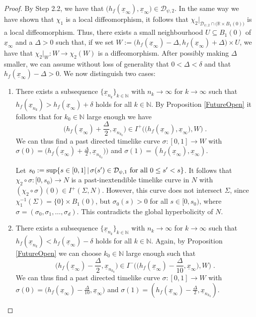 \documentclass[reqno]{article}
\newcommand{\N}{\mathbb{N}}
\newcommand{\R}{\mathbb{R}}
\newcommand{\D}{\mathcal{D}}
\newcommand{\ux}{\underline{x}}
\begin{document}
\begin{proof}
By Step 2.2, we have that $\big(h_f(\ux_\infty), \ux_\infty\big) \in \D_{\psi,2}$. In the same way we have shown that $\chi_1$ is a local diffeomorphism, it follows that $\chi_2|_{\D_{\psi,2} \cap \big(\R \times B_1(0)\big)}$ is a local diffeomorphism. Thus, there exists a small neighbourhood $U \subseteq B_1(0)$ of $\ux_\infty$ and a $\Delta >0$  such that, if we set $W :=\big(h_f(\ux_\infty) - \Delta, h_f(\ux_\infty) + \Delta) \times U$, we have that $\chi_2|_W : W \to \chi_2(W)$ is a diffeomorphism. After possibly making $\Delta$ smaller, we can assume without loss of generality that $0 < \Delta < \delta$ and that $h_f(\ux_\infty) - \Delta >0$.
We now distinguish two cases:
\begin{enumerate}
\item There exists a subsequence $\{\ux_{n_k}\}_{k \in \N}$ with $n_k \to \infty$ for $k \to \infty$ such that $h_f(\ux_{n_k}) > h_f(\ux_\infty) + \delta$ holds for all $k \in \N$. By Proposition \ref{FutureOpen} it follows that for $k_0 \in \N$ large enough we have 
\begin{equation*}
\big( h_f(\ux_\infty) + \frac{\Delta}{2}, \ux_{n_{k_0}}\big) \in I^+\Big(\big(h_f(\ux_\infty), \ux_\infty\big), W\Big) \;.
\end{equation*}
We can thus find a past directed timelike curve $\sigma : [0,1] \to W$ with $\sigma(0) =\big( h_f(\ux_\infty) + \frac{\Delta}{2}, \ux_{n_{k_0}})\big)$ and $\sigma(1) =(h_f(\ux_\infty), \ux_\infty)$. 
\begin{center}
\def\svgwidth{8cm}

\end{center}
Let $s_0 := \sup\{s \in [0,1] \, | \, \sigma(s') \in \D_{\psi,1} \textnormal{ for all } 0 \leq s' < s\}$. It follows that $\chi_2 \circ \sigma : [0,s_0) \to N$ is a past-inextendible timelike curve in $N$ with $(\chi_2 \circ \sigma)(0) \in I^+(\Sigma, N)$. However, this curve does not intersect $\Sigma$, since $\chi_1^{-1}(\Sigma) = \{0\} \times B_1(0)$, but $\sigma_0 (s) >0$ for all $s \in [0,s_0)$, where $ \sigma = (\sigma_0, \sigma_1, \ldots, \sigma_d)$. This contradicts the global hyperbolicity of $N$.

\item There exists a subsequence $\{\ux_{n_k}\}_{k \in \N}$ with $n_k \to \infty$ for $k \to \infty$ such that $h_f(\ux_{n_k}) < h_f(\ux_\infty) - \delta$ holds for all $k \in \N$. Again, by Proposition \ref{FutureOpen} we can choose $k_0 \in \N$ large enough such that
\begin{equation*}
\big(h_f(\ux_\infty) - \frac{\Delta}{2}, \ux_{n_{k_0}}\big) \in I^-\Big(\big(h_f(\ux_\infty) - \frac{\Delta}{10}, \ux_\infty\big),W\Big) \;.
\end{equation*}
We can thus find a past directed timelike curve $\sigma : [0,1] \to W$ with $\sigma(0) =\big( h_f(\ux_\infty) - \frac{\Delta}{10}, \ux_\infty\big)$ and $\sigma(1) =(h_f(\ux_\infty) - \frac{\Delta}{2}, \ux_{n_{k_0}})$. 


\end{enumerate}
\end{proof}
\end{document}
